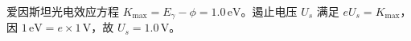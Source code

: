 爱因斯坦光电效应方程 $K_{\max}=E_\gamma-\phi=1.0\,\mathrm{eV}$。遏止电压 $U_s$ 满足 $eU_s=K_{\max}$，因 $1\,\mathrm{eV}=e\times1\,\mathrm V$，故 $U_s=1.0\,\mathrm V$。

